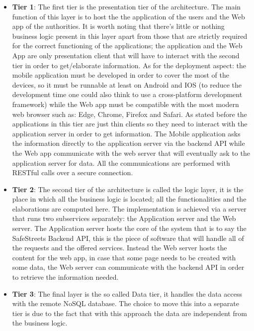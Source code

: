 \begin{itemize}
  \item \textbf{Tier 1}: The first tier is the presentation tier of the architecture. The main function of this layer is to host the  the application of the users and the Web app of the authorities. It is worth noting that there's little or nothing business logic present in this layer apart from those that are strictly required for the correct functioning of the applications; the application and the Web App are only presentation client that will have to interact with the second tier in order to get/elaborate information. As for the deployment aspect: the mobile application must be developed in order to cover the most of the devices, so it must be runnable at least on Android and IOS (to reduce the development time one could also think to use a cross-platform development framework) while the Web app must be compatible with the most modern web browser such as: Edge, Chrome, Firefox and Safari. As stated before the applications in this tier are just thin clients so they need to interact with the application server in order to get information. The Mobile application asks the information directly to the application server via the backend API while the Web app communicate with the web server that will eventually ask to the application server for data. All the communications are performed with RESTful calls over a secure connection.
  \item \textbf{Tier 2}: The second tier of the architecture is called the logic layer, it is the place in which all the business logic is located; all the functionalities and the elaborations are computed here. The implementation is achieved via a server that runs two subservices separately: the Application server and the Web server. The Application server hosts the core of the system that is to say the SafeStreets Backend API, this is the piece of software that will handle all of the requests and the offered services. Instead the Web server hosts the content for the web app, in case that some page needs to be created with some data, the Web server can communicate with the backend API in order to retrieve the information needed.
  \item \textbf{Tier 3}: The final layer is the so called Data tier, it handles the data access with the remote NoSQL database. The    choice to move this into a separate tier is due to the fact       that with this approach the data are independent from the         business logic.
\end{itemize}
